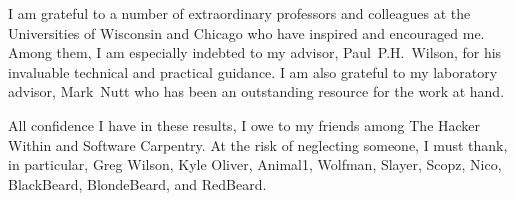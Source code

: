 I am grateful to a number of extraordinary professors and colleagues at the 
Universities of Wisconsin and Chicago who have inspired and encouraged me. Among  
them, I am especially indebted to my advisor, Paul~P.H.~Wilson, for his invaluable 
technical and practical guidance. I am also grateful to my laboratory advisor, 
Mark~Nutt who has been an outstanding resource for the work at hand.

All confidence I have in these results, I owe to my friends among The Hacker 
Within and Software Carpentry. At the risk of neglecting someone, I must thank, 
in particular, Greg Wilson, Kyle Oliver, Animal1, Wolfman, Slayer, Scopz, Nico,  
BlackBeard, BlondeBeard, and RedBeard.  


